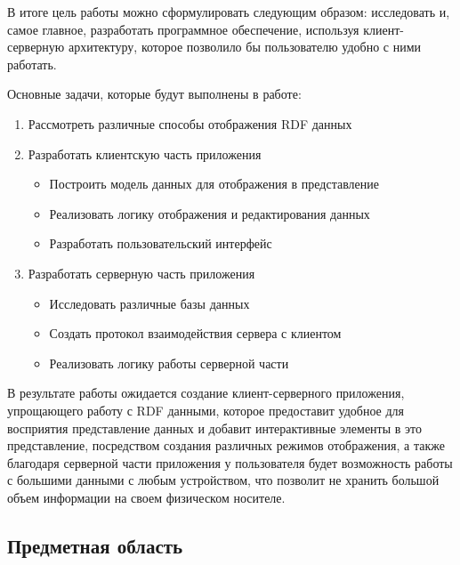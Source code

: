 \documentclass[12pt]{article}
\begin{document}
В итоге цель работы можно сформулировать следующим образом: исследовать и, самое главное, разработать программное обеспечение, используя клиент-серверную архитектуру, которое позволило бы пользователю удобно с ними работать.\par

Основные задачи, которые будут выполнены в работе:
\begin{enumerate}
    \item Рассмотреть различные способы отображения RDF данных
    \item Разработать клиентскую часть приложения
          \begin{itemize}
              \item Построить модель данных для отображения в представление
              \item Реализовать логику отображения и редактирования данных
              \item Разработать пользовательский интерфейс
          \end{itemize}
    \item Разработать серверную часть приложения
          \begin{itemize}
              \item Исследовать различные базы данных
              \item Создать протокол взаимодействия сервера с клиентом
              \item Реализовать логику работы серверной части
          \end{itemize}
\end{enumerate}

В результате работы ожидается создание клиент-серверного приложения, упрощающего работу с RDF данными, которое предоставит удобное для восприятия представление данных и добавит интерактивные элементы в это представление, посредством создания различных режимов отображения, а также благодаря серверной части приложения у пользователя будет возможность работы с большими данными с любым устройством, что позволит не хранить большой объем информации на своем физическом носителе.

\pagebreak

\sectionfont{\bfseries\Large}
\subsectionfont{\RaggedRight}
\begin{center}
    {\section{Предметная область}}
\end{center}
\end{document}

